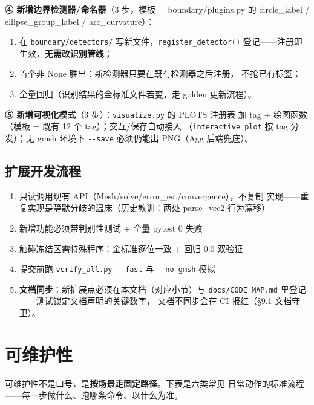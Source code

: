 \documentclass[12pt,a4paper]{ctexart}
\newcommand{\fem}{\Verb}
\begin{document}
\textbf{④ 新增边界检测器/命名器}（3 步，模板 = boundary/plugins.py
的 circle\_label / ellipse\_group\_label / arc\_curvature）：
\begin{enumerate}[leftmargin=*]
  \item 在 \fem|boundary/detectors/| 写新文件，\fem|register_detector()|
        登记——注册即生效，\textbf{无需改识别管线}；
  \item 首个非 None 胜出：新检测器只要在既有检测器之后注册，
        不抢已有标签；
  \item 全量回归（识别结果的金标准文件若变，走 golden 更新流程）。
\end{enumerate}

\textbf{⑤ 新增可视化模式}（3 步）：\fem|visualize.py| 的 PLOTS 注册表
加 tag + 绘图函数（模板 = 既有 12 个 tag）；交互/保存自动接入
（\fem|interactive_plot| 按 tag 分发）；无 gmsh 环境下 \fem|--save|
必须仍能出 PNG（Agg 后端兜底）。

\subsection{扩展开发流程}

\begin{enumerate}[leftmargin=*]
  \item 只读调用现有 API（Mesh/solve/error\_est/convergence），不复制
        实现——重复实现是静默分歧的温床（历史教训：两处 parse\_vec2
        行为漂移）
  \item 新增功能必须带判别性测试 + 全量 pytest 0 失败
  \item 触碰冻结区需特殊程序：金标准逐位一致 + 回归 0.0 双验证
  \item 提交前跑 \fem|verify_all.py --fast| 与 \fem|--no-gmsh| 模拟
  \item \textbf{文档同步}：新扩展点必须在本文档（对应小节）与
        \fem|docs/CODE_MAP.md| 里登记——测试锁定文档声明的关键数字，
        文档不同步会在 CI 报红（§9.1 文档守卫）。
\end{enumerate}

\section{可维护性}

可维护性不是口号，是\textbf{按场景走固定路径}。下表是六类常见
日常动作的标准流程——每一步做什么、跑哪条命令、以什么为准。
\end{document}
